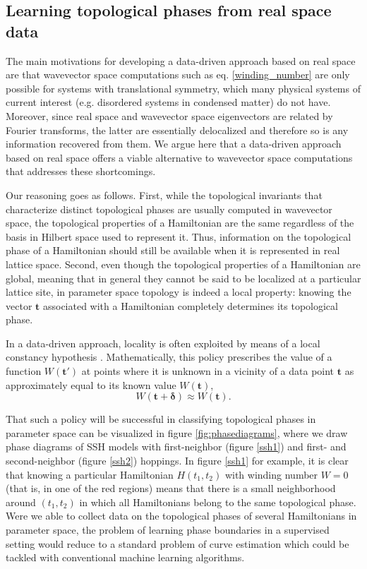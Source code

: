 \documentclass[fleqn,10pt]{wlscirep}
\begin{document}
\subsection*{Learning topological phases from real space data}

The main motivations for developing a data-driven approach based on real space are that wavevector space computations such as eq. \eqref{winding_number} are only possible for systems with translational symmetry, which many physical systems of current interest (e.g. disordered systems in condensed matter) do not have. Moreover, since real space and wavevector space eigenvectors are related by Fourier transforms, the latter are essentially delocalized and therefore so is any information recovered from them. We argue here that a data-driven approach based on real space offers a viable alternative to wavevector space computations that addresses these shortcomings.

Our reasoning goes as follows. First, while the topological invariants that characterize distinct topological phases are usually computed in wavevector space, the topological properties of a Hamiltonian are the same regardless of the basis in Hilbert space used to represent it. Thus, information on the topological phase of a Hamiltonian should still be available when it is represented in real lattice space. Second, even though the topological properties of a Hamiltonian are global, meaning that in general they cannot be said to be localized at a particular lattice site, in parameter space topology is indeed a local property: knowing the vector $\mathbf{t}$ associated with a Hamiltonian completely determines its topological phase.

In a data-driven approach, locality is often exploited by means of a local constancy hypothesis . Mathematically, this policy prescribes the value of a function $W(\mathbf{t}')$ at points where it is unknown in a vicinity of a data point $\mathbf{t}$ as approximately equal to its known value $W(\mathbf{t})$,
\begin{equation}
\label{localconstancy}
W(\mathbf{t} + \boldsymbol{\delta}) \approx W(\mathbf{t}).
\end{equation}

That such a policy will be successful in classifying topological phases in parameter space can be visualized in figure \ref{fig:phasediagrams}, where we draw phase diagrams of SSH models with first-neighbor (figure \ref{ssh1}) and first- and second-neighbor (figure \ref{ssh2}) hoppings. In figure \ref{ssh1} for example, it is clear that knowing a particular Hamiltonian $H(t_1,t_2)$ with winding number $W = 0$ (that is, in one of the red regions) means that there is a small neighborhood around $(t_1,t_2)$ in which all Hamiltonians  belong to the same topological phase. Were we able to collect data on the topological phases of several Hamiltonians in parameter space, the problem of learning phase boundaries in a supervised setting would reduce to a standard problem of curve estimation which could be tackled with conventional machine learning algorithms.
\end{document}
